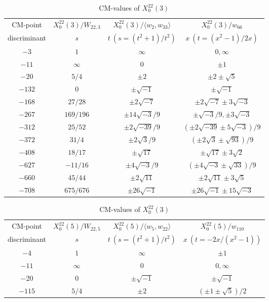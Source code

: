 \documentclass{amsart}
\theoremstyle{definition}
\begin{document}
\begin{appendices}
\renewcommand{\arraystretch}{1.5}
\tabcolsep=10pt                         
\begin{table}
\begin{tabular}{|c|c|c|c|}
\hline
CM-point& $X_{0}^{22}\left( 3\right) /W_{22,3}$ & $X_{0}^{22}\left( 3\right)
/\langle w_2,w_{33}\rangle$ & $X_{0}^{22}\left( 3\right) /w_{66}$ \\
discriminant & $s$ & $t\ (s=(t^2+1)/{t^2})$ & $x\ (t=(x^2-1)/2x)$ \\ \hline
${-3}$ & $1$ & $\infty $ & $0,\infty$ \\ 
${-11}$ & $\infty $ & $0$ & $\pm 1$ \\ 
${-20}$ & ${5}/{4}$ & $\pm 2$ & $\pm 2\pm \sqrt{5}$ \\
${-132}$ & $0$ & $\pm \sqrt{-1}$ & $\pm \sqrt{-1}$ \\
${-168}$ & ${27}/{28}$ & $\pm 2\sqrt{-7}$ & $\pm 2\sqrt{-7}\pm 3\sqrt{-3%
}$ \\
${-267}$ & ${169}/{196}$ & $\pm{ 14\sqrt{-3}}/{9}$ & $\pm{ 
\sqrt{-3}}/{9},\pm 3\sqrt{-3}$ \\ 
${-312}$ & ${25}/{52}$ & $\pm{ 2\sqrt{-39}}/{9}$ & $(\pm 2%
\sqrt{-39}\pm 5\sqrt{-3})/{9}$ \\ 
${-372}$ & ${31}/{4}$ & $\pm{ 2\sqrt{3}}/{9}$ & $(\pm 2\sqrt{3%
}\pm \sqrt{93})/{9}$ \\ 
${-408}$ & ${18}/{17}$ & $\pm \sqrt{17}$ & $\pm \sqrt{17}\pm 3\sqrt{2}$
\\
${-627}$ & $-{11}/{16}$ & $\pm{ 4\sqrt{-3}}/{9}$ & $(\pm 4%
\sqrt{-3}\pm \sqrt{33})/{9}$ \\
${-660}$ & ${45}/{44}$ & $\pm 2\sqrt{11}$ & $\pm 2\sqrt{11}\pm 3\sqrt{5%
}$ \\
${-708}$ & ${675}/{676}$ & $\pm 26\sqrt{-1}$ & $\pm
26\sqrt{-1}\pm 15\sqrt{-3}$ \\ \hline
\end{tabular}
\bigskip
\caption{CM-values of $X^{22}_0(3)$}



\renewcommand{\arraystretch}{1.5}
\tabcolsep=10pt                         
\begin{tabular}{|c|c|c|c|}
\hline
CM-point& $X_{0}^{22}\left( 5\right) /W_{22,5}$ & $X_{0}^{22}\left( 5\right)
/\langle w_{5},w_{22}\rangle$ & $X_{0}^{22}\left( 5\right) /w_{110}$ \\ 
discriminant & $s$ & $t\ (s=(t^2+1)/{t^2})$ & $x\ (t={-2x}/(x^2-1))$ \\ \hline
${-4}$ & $1$ & $\infty $ & $\pm 1$ \\ 
${-11}$ & $\infty $ & $0$ & $0,\infty$ \\ 
${-20}$ & $0$ & $\pm \sqrt{-1}$ & $\pm \sqrt{-1}$ \\
${-115}$ & ${5}/{4}$ & $\pm 2$ & $(\pm 1\pm \sqrt{5})/{2}$ \\ 


\end{tabular}
\end{table}
\end{appendices}
\end{document}
